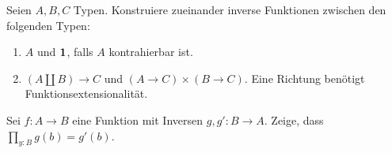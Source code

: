 \documentclass{uebung}
\begin{document}

\begin{exercise}
  Seien $A,B,C$ Typen.
  Konstruiere zueinander inverse Funktionen zwischen den folgenden Typen:
  \begin{enumerate}
    \item $A$ und $\mathbf{1}$, falls $A$ kontrahierbar ist.
    \item $(A \amalg B) \to C$ und $(A\to C) \times (B\to C)$.
      {\tiny Eine Richtung benötigt Funktionsextensionalität.}
  \end{enumerate}
\end{exercise}

\begin{exercise}
  Sei $f:A\to B$ eine Funktion mit Inversen $g,g':B\to A$.
  Zeige, dass $\prod_{y:B}g(b)=g'(b)$.
\end{exercise}
\end{document}
